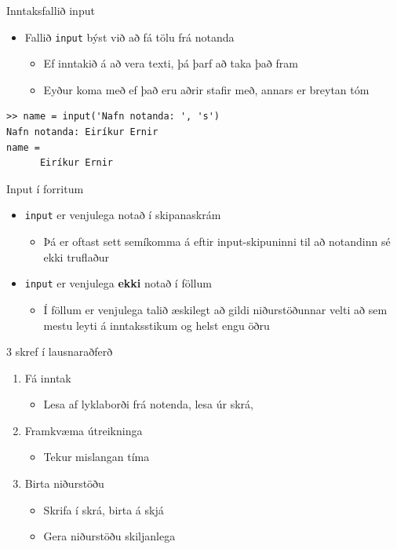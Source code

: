 \documentclass[handout]{beamer}
\begin{document}
\begin{frame}[fragile]{Inntaksfallið input}
\begin{itemize}
 \item Fallið \texttt{input} býst við að fá tölu frá notanda
 \begin{itemize}
  \item Ef inntakið á að vera texti, þá þarf að taka það fram
  \item Eyður koma með ef það eru aðrir stafir með, annars er breytan tóm
 \end{itemize}
\end{itemize}

\begin{verbatim}
>> name = input('Nafn notanda: ', 's')
Nafn notanda: Eiríkur Ernir
name = 
      Eiríkur Ernir
\end{verbatim}
\end{frame}

\begin{frame}{Input í forritum}
\begin{itemize}
 \item \texttt{input} er venjulega notað í skipanaskrám
 \begin{itemize}
  \item Þá er oftast sett semíkomma á eftir input-skipuninni til að notandinn sé ekki truflaður
 \end{itemize}
 \item \texttt{input} er venjulega \textbf{ekki} notað í föllum
 \begin{itemize}
  \item Í föllum er venjulega talið æskilegt að gildi niðurstöðunnar velti að sem mestu leyti á inntaksstikum og helst engu öðru
 \end{itemize}
\end{itemize}
\end{frame}

\begin{frame}{3 skref í lausnaraðferð}
\begin{enumerate}
 \item Fá inntak
 \begin{itemize}
  \item Lesa af lyklaborði frá notenda, lesa úr skrá, 
 \end{itemize}
 \item Framkvæma útreikninga
 \begin{itemize}
  \item Tekur mislangan tíma
 \end{itemize}
 \item Birta niðurstöðu
 \begin{itemize}
  \item Skrifa í skrá, birta á skjá
  \item Gera niðurstöðu skiljanlega
 \end{itemize}
\end{enumerate}
\end{frame}
\end{document}
